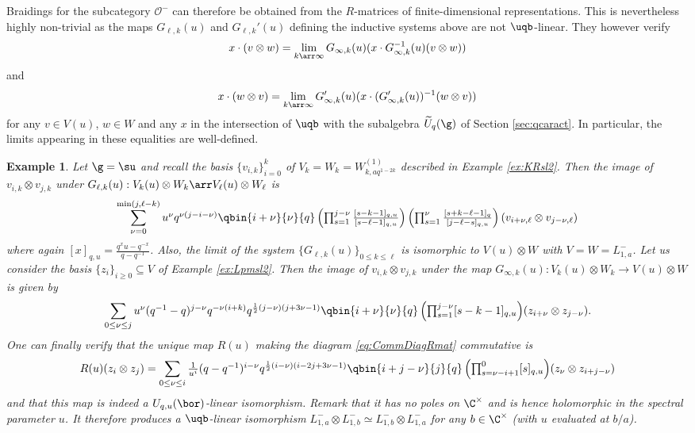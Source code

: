 \documentclass[11pt]{amsart}
\newtheorem{example}[theorem]{Example}
\theoremstyle{definition}
\theoremstyle{remark}
\numberwithin{equation}{section}
\begin{document}
Braidings for the subcategory $\mathcal{O}^-$ can therefore be obtained from the $R$-matrices of finite-dimensional representations. This is nevertheless highly non-trivial as the maps $G_{\ell,k}(u)$ and $G_{\ell,k}'(u)$ defining the inductive systems above are not $\uqb$-linear. They however verify
$$ \displaystyle x\cdot (v\otimes w) = \lim_{k\arr \infty} G_{\infty,k}(u)(x\cdot G_{\infty,k}^{-1}(u)(v\otimes w))$$ 
and 
$$\displaystyle x\cdot (w\otimes v) = \lim_{k\arr \infty} G_{\infty,k}'(u)(x\cdot (G_{\infty,k}'(u))^{-1}(w\otimes v))$$
for any $v\in V(u)$, $w\in W$ and any $x$ in the intersection of $\uqb$ with the subalgebra $\widetilde{U}_q(\g)$ of Section \ref{sec:qcaract}. In particular, the limits appearing in these equalities are well-defined.
\begin{example}\label{ex:RmatLm} Let $\g=\su$ and recall the basis $\{v_{i,k}\}_{i=0}^k$ of $V_k = W_k= W_{k,aq^{1-2k}}^{(1)}$ described in Example \ref{ex:KRsl2}. Then the image of $v_{i,k}\otimes v_{j,k}$ under $G_{\ell,k}(u):V_k(u)\otimes W_k \arr V_{\ell}(u)\otimes W_{\ell}$ is 
$$ \sum_{\nu = 0}^{\min(j,\ell-k)} {\textstyle u^{\nu}q^{\nu(j-i-\nu)}\qbin{i+\nu}{\nu}{q}\left(\prod_{s=1}^{j-\nu}\frac{[s-k-1]_{q,u}}{[s-\ell-1]_{q,u}}\right)\left(\prod_{s=1}^{\nu}\frac{[s+k-\ell-1]_{q}}{[j-\ell-s]_{q,u}}\right)(v_{i+\nu,\ell}\otimes v_{j-\nu,\ell})}$$
where again $[x]_{q,u} = \frac{q^x u-q^{-x}}{q-q^{-1}}$. Also, the limit of the system $\{G_{\ell,k}(u)\}_{0\leq k\leq \ell}$ is isomorphic to $V(u)\otimes W$ with $V = W= L_{1,a}^-$. Let us consider the basis $\{z_i\}_{i\geq 0}\subseteq V$ of Example \ref{ex:Lpmsl2}. Then the image of $v_{i,k}\otimes v_{j,k}$ under the map $G_{\infty,k}(u):V_k(u)\otimes W_k \rightarrow V(u)\otimes W$ is given by
$$ \sum_{0\leq \nu\leq j}{\textstyle u^{\nu}(q^{-1}-q)^{j-\nu}q^{-\nu(i+k)}q^{\frac{1}{2}(j-\nu)(j+3\nu-1)}\qbin{i+\nu}{\nu}{q}\left(\prod_{s=1}^{j-\nu}[s-k-1]_{q,u}\right)
}(z_{i+\nu}\otimes z_{j-\nu}).$$
One can finally verify that the unique map $R(u)$ making the diagram \eqref{eq:CommDiagRmat} commutative is 
$$R(u)(z_i\otimes z_j) = \sum_{0\leq \nu\leq i}{\textstyle\frac{1}{u^{i}} (q-q^{-1})^{i-\nu}q^{\frac{1}{2}(i-\nu)(i-2j+3\nu-1)}\qbin{i+j-\nu}{j}{q} \left(\prod_{s=\nu-i+1}^0 [s]_{q,u}\right)}(z_{\nu}\otimes z_{i+j-\nu})$$
and that this map is indeed a $U_{q,u}(\bor)$-linear isomorphism. Remark that it has no poles on $\C^{\times}$ and is hence holomorphic in the spectral parameter $u$. It therefore produces a $\uqb$-linear isomorphism $L_{1,a}^-\otimes L_{1,b}^{-}\simeq L_{1,b}^{-}\otimes L_{1,a}^-$ for any $b \in \C^{\times}$ (with $u$ evaluated at $b/a$).
\end{example}
\end{document}
